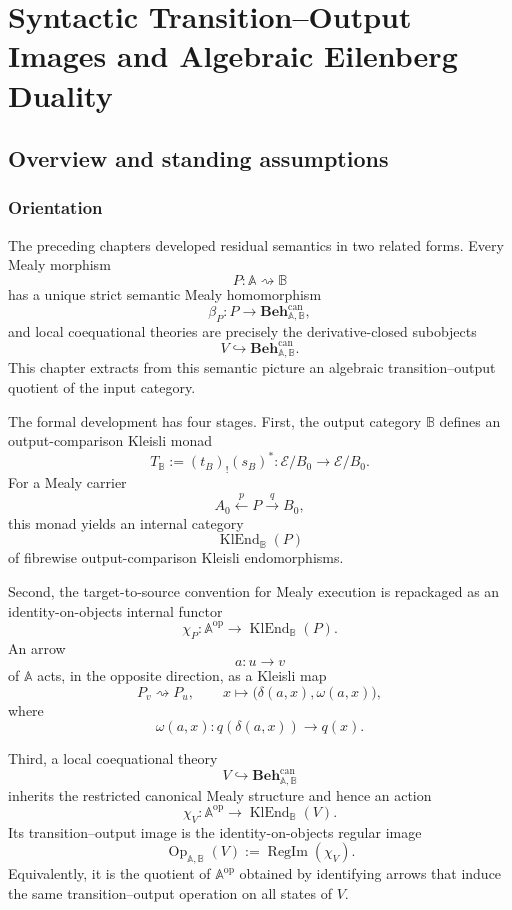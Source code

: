 \chapter{Syntactic Transition--Output Images and Algebraic Eilenberg Duality}
\label{ch:syntactic-transition-output-eilenberg}

\section{Overview and standing assumptions}
\label{sec:syntactic-to-overview-standing-assumptions}


\subsection{Orientation}
\label{subsec:syntactic-to-orientation}

The preceding chapters developed residual semantics in two related forms. Every
Mealy morphism
\[
    P:\mathbb A\rightsquigarrow\mathbb B
\]
has a unique strict semantic Mealy homomorphism
\[
    \beta_P:
    P\to\mathbf{Beh}^{\mathrm{can}}_{\mathbb A,\mathbb B},
\]
and local coequational theories are precisely the derivative-closed subobjects
\[
    V\hookrightarrow
    \mathbf{Beh}^{\mathrm{can}}_{\mathbb A,\mathbb B}.
\]
This chapter extracts from this semantic picture an algebraic
transition--output quotient of the input category.

The formal development has four stages. First, the output category
\(\mathbb B\) defines an output-comparison Kleisli monad
\[
    T_{\mathbb B}:=(t_B)_!(s_B)^*:
    \mathcal E/B_0\to\mathcal E/B_0.
\]
For a Mealy carrier
\[
    A_0\xleftarrow{p}P\xrightarrow{q}B_0,
\]
this monad yields an internal category
\[
    \operatorname{KlEnd}_{\mathbb B}(P)
\]
of fibrewise output-comparison Kleisli endomorphisms.

Second, the target-to-source convention for Mealy execution is repackaged as an
identity-on-objects internal functor
\[
    \chi_P:
    \mathbb A^{\mathrm{op}}
    \longrightarrow
    \operatorname{KlEnd}_{\mathbb B}(P).
\]
An arrow
\[
    a:u\to v
\]
of \(\mathbb A\) acts, in the opposite direction, as a Kleisli map
\[
    P_v\rightsquigarrow P_u,
    \qquad
    x\longmapsto
    \bigl(\delta(a,x),\omega(a,x)\bigr),
\]
where
\[
    \omega(a,x):q(\delta(a,x))\to q(x).
\]

Third, a local coequational theory
\[
    V\hookrightarrow
    \mathbf{Beh}^{\mathrm{can}}_{\mathbb A,\mathbb B}
\]
inherits the restricted canonical Mealy structure and hence an action
\[
    \chi_V:
    \mathbb A^{\mathrm{op}}
    \longrightarrow
    \operatorname{KlEnd}_{\mathbb B}(V).
\]
Its transition--output image is the identity-on-objects regular image
\[
    \operatorname{Op}_{\mathbb A,\mathbb B}(V)
    :=
    \operatorname{RegIm}(\chi_V).
\]
Equivalently, it is the quotient of \(\mathbb A^{\mathrm{op}}\) obtained by
identifying arrows that induce the same transition--output operation on all
states of \(V\).

